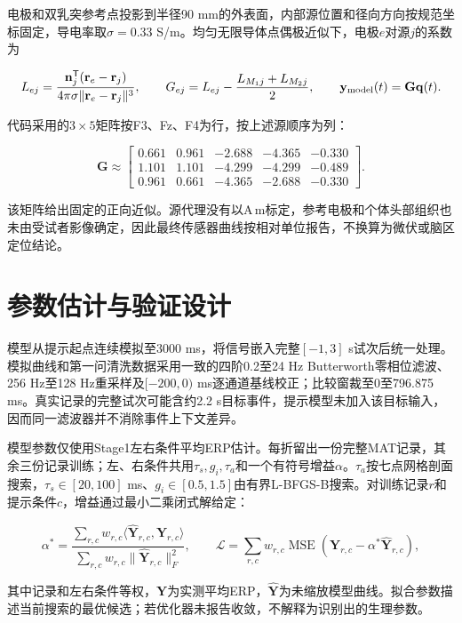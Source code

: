 电极和双乳突参考点投影到半径90 mm的外表面，内部源位置和径向方向按规范坐标固定，导电率取\(\sigma=0.33\) S/m。均匀无限导体点偶极近似下，电极\(e\)对源\(j\)的系数为

\[
L_{ej}=\frac{\mathbf n_j^{\mathsf T}(\mathbf r_e-\mathbf r_j)}
{4\pi\sigma\lVert\mathbf r_e-\mathbf r_j\rVert^3},\qquad
G_{ej}=L_{ej}-\frac{L_{M_1j}+L_{M_2j}}{2},\qquad
\mathbf y_{\rm model}(t)=\mathbf G\mathbf q(t).
\]

代码采用的\(3\times5\)矩阵按F3、Fz、F4为行，按上述源顺序为列：

\[
\mathbf G\approx\begin{bmatrix}
0.661&0.961&-2.688&-4.365&-0.330\\
1.101&1.101&-4.299&-4.299&-0.489\\
0.961&0.661&-4.365&-2.688&-0.330
\end{bmatrix}.
\]

该矩阵给出固定的正向近似。源代理没有以\(\mathrm{A\,m}\)标定，参考电极和个体头部组织也未由受试者影像确定，因此最终传感器曲线按相对单位报告，不换算为微伏或脑区定位结论。

\hypertarget{ux53c2ux6570ux4f30ux8ba1ux4e0eux9a8cux8bc1ux8bbeux8ba1}{%
\section{参数估计与验证设计}\label{ux53c2ux6570ux4f30ux8ba1ux4e0eux9a8cux8bc1ux8bbeux8ba1}}

模型从提示起点连续模拟至3000 ms，将信号嵌入完整\([-1,3]\) s试次后统一处理。模拟曲线和第一问清洗数据采用一致的四阶0.2至24 Hz Butterworth零相位滤波、256 Hz至128 Hz重采样及\([-200,0)\) ms逐通道基线校正；比较窗裁至0至796.875 ms。真实记录的完整试次可能含约2.2 s目标事件，提示模型未加入该目标输入，因而同一滤波器并不消除事件上下文差异。

模型参数仅使用Stage1左右条件平均ERP估计。每折留出一份完整MAT记录，其余三份记录训练；左、右条件共用\(\tau_s,g_i,\tau_a\)和一个有符号增益\(\alpha\)。\(\tau_a\)按七点网格剖面搜索，\(\tau_s\in[20,100]\) ms、\(g_i\in[0.5,1.5]\)由有界L-BFGS-B搜索。对训练记录\(r\)和提示条件\(c\)，增益通过最小二乘闭式解给定：

\[
\alpha^*=\frac{\sum_{r,c}w_{r,c}\langle\widehat{\mathbf Y}_{r,c},\mathbf Y_{r,c}\rangle}
{\sum_{r,c}w_{r,c}\lVert\widehat{\mathbf Y}_{r,c}\rVert_F^2},\qquad
\mathcal L=\sum_{r,c}w_{r,c}\operatorname{MSE}\!\left(\mathbf Y_{r,c}-\alpha^*\widehat{\mathbf Y}_{r,c}\right),
\]

其中记录和左右条件等权，\(\mathbf Y\)为实测平均ERP，\(\widehat{\mathbf Y}\)为未缩放模型曲线。拟合参数描述当前搜索的最优候选；若优化器未报告收敛，不解释为识别出的生理参数。


